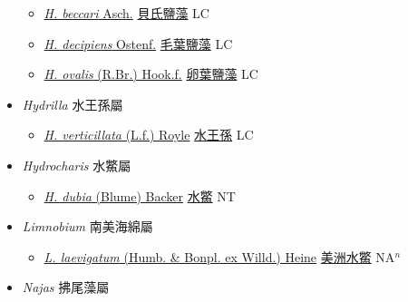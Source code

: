 \begin{itemize}
  \begin{itemize}
        \item[] \href{http://www.theplantlist.org/tpl1.1/search?q=Halophila+beccari}{\textit{H. beccari} Asch.}   \href{\detokenize{http://taibnet.sinica.edu.tw/chi/taibnet_species_list.php?T2=貝氏鹽藻&T2_new_value=true&fr=y}}{貝氏鹽藻} LC
        \item[] \href{http://www.theplantlist.org/tpl1.1/search?q=Halophila+decipiens}{\textit{H. decipiens} Ostenf.}   \href{\detokenize{http://taibnet.sinica.edu.tw/chi/taibnet_species_list.php?T2=毛葉鹽藻&T2_new_value=true&fr=y}}{毛葉鹽藻} LC
        \item[] \href{http://www.theplantlist.org/tpl1.1/search?q=Halophila+ovalis}{\textit{H. ovalis} (R.Br.) Hook.f.}   \href{\detokenize{http://taibnet.sinica.edu.tw/chi/taibnet_species_list.php?T2=卵葉鹽藻&T2_new_value=true&fr=y}}{卵葉鹽藻} LC
  \end{itemize}
 \item[] \textit{Hydrilla} 水王孫屬
                    
  \begin{itemize}
        \item[] \href{http://www.theplantlist.org/tpl1.1/search?q=Hydrilla+verticillata}{\textit{H. verticillata} (L.f.) Royle}   \href{\detokenize{http://taibnet.sinica.edu.tw/chi/taibnet_species_list.php?T2=水王孫&T2_new_value=true&fr=y}}{水王孫} LC
  \end{itemize}
 \item[] \textit{Hydrocharis} 水鱉屬
                    
  \begin{itemize}
        \item[] \href{http://www.theplantlist.org/tpl1.1/search?q=Hydrocharis+dubia}{\textit{H. dubia} (Blume) Backer}   \href{\detokenize{http://taibnet.sinica.edu.tw/chi/taibnet_species_list.php?T2=水鱉&T2_new_value=true&fr=y}}{水鱉} NT
  \end{itemize}
 \item[] \textit{Limnobium} 南美海綿屬
                    
  \begin{itemize}
        \item[] \href{http://www.theplantlist.org/tpl1.1/search?q=Limnobium+laevigatum}{\textit{L. laevigatum} (Humb. \& Bonpl. ex Willd.) Heine}   \href{\detokenize{http://taibnet.sinica.edu.tw/chi/taibnet_species_list.php?T2=美洲水鱉&T2_new_value=true&fr=y}}{美洲水鱉} NA$^n$
  \end{itemize}
 \item[] \textit{Najas} 拂尾藻屬
                    

\end{itemize}
